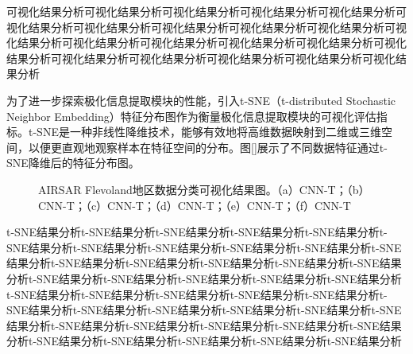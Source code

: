 可视化结果分析可视化结果分析可视化结果分析可视化结果分析可视化结果分析可视化结果分析可视化结果分析可视化结果分析可视化结果分析可视化结果分析可视化结果分析可视化结果分析可视化结果分析可视化结果分析可视化结果分析可视化结果分析可视化结果分析可视化结果分析可视化结果分析可视化结果分析可视化结果分析

为了进一步探索极化信息提取模块的性能，引入t-SNE（t-distributed Stochastic Neighbor Embedding）\citing{}特征分布图作为衡量极化信息提取模块的可视化评估指标。t-SNE是一种非线性降维技术，能够有效地将高维数据映射到二维或三维空间，以便更直观地观察样本在特征空间的分布。图\ref{}展示了不同数据特征通过t-SNE降维后的特征分布图。
\begin{figure}[ht]
    \quad
    \caption{AIRSAR Flevoland地区数据分类可视化结果图。（a）CNN-T；（b）CNN-T；（c）CNN-T；（d）CNN-T；（e）CNN-T；（f）CNN-T}
    \label{fle-tSNE}
\end{figure}

t-SNE结果分析t-SNE结果分析t-SNE结果分析t-SNE结果分析t-SNE结果分析t-SNE结果分析t-SNE结果分析t-SNE结果分析t-SNE结果分析t-SNE结果分析t-SNE结果分析t-SNE结果分析t-SNE结果分析t-SNE结果分析t-SNE结果分析t-SNE结果分析t-SNE结果分析t-SNE结果分析t-SNE结果分析t-SNE结果分析t-SNE结果分析t-SNE结果分析t-SNE结果分析t-SNE结果分析t-SNE结果分析t-SNE结果分析t-SNE结果分析t-SNE结果分析t-SNE结果分析t-SNE结果分析t-SNE结果分析t-SNE结果分析t-SNE结果分析t-SNE结果分析t-SNE结果分析t-SNE结果分析t-SNE结果分析t-SNE结果分析t-SNE结果分析t-SNE结果分析t-SNE结果分析t-SNE结果分析

